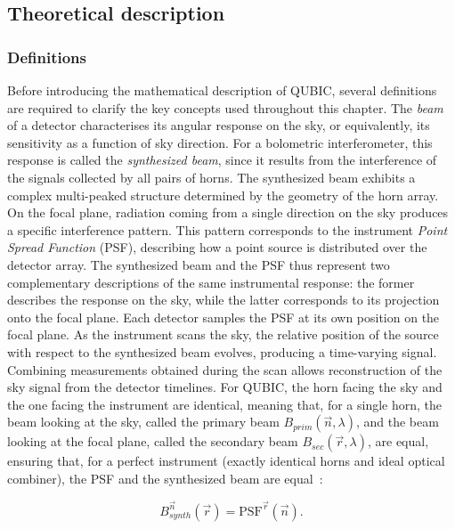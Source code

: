 \documentclass[../../thesis.tex]{subfiles}
\begin{document}
\subsection{Theoretical description}

\subsubsection{Definitions}

Before introducing the mathematical description of QUBIC, several definitions are required to clarify the key concepts used throughout this chapter.
The \emph{beam} of a detector characterises its angular response on the sky, or equivalently, its sensitivity as a function of sky direction. For a bolometric interferometer, this response is called the \emph{synthesized beam}, since it results from the interference of the signals collected by all pairs of horns. The synthesized beam exhibits a complex multi-peaked structure determined by the geometry of the horn array.
On the focal plane, radiation coming from a single direction on the sky produces a specific interference pattern. This pattern corresponds to the instrument \emph{Point Spread Function} (PSF), describing how a point source is distributed over the detector array. The synthesized beam and the PSF thus represent two complementary descriptions of the same instrumental response: the former describes the response on the sky, while the latter corresponds to its projection onto the focal plane.
Each detector samples the PSF at its own position on the focal plane. As the instrument scans the sky, the relative position of the source with respect to the synthesized beam evolves, producing a time-varying signal. Combining measurements obtained during the scan allows reconstruction of the sky signal from the detector timelines. 
For QUBIC, the horn facing the sky and the one facing the instrument are identical, meaning that, for a single horn, the beam looking at the sky, called the primary beam $B_{prim}(\vec{n}, \lambda)$, and the beam looking at the focal plane, called the secondary beam $B_{sec}(\vec{r}, \lambda)$, are equal, ensuring that, for a perfect instrument (exactly identical horns and ideal optical combiner), the PSF and the synthesized beam are equal~\cite{QUBICVIII}: 

\begin{equation} \label{eq:synth_beam_init}
    B_{synth}^{\vec{n}}(\vec{r}) = \mathrm{PSF}^{\vec{r}}(\vec{n}).
\end{equation}
\end{document}
